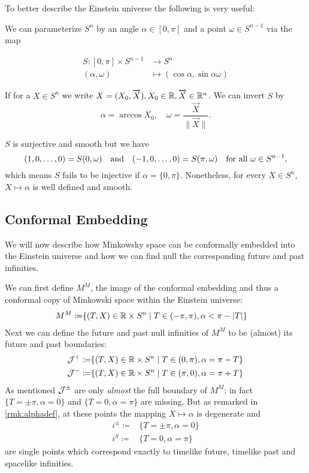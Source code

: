 To better describe the Einstein universe the following is very useful:
\begin{remark}\label{rmk:alphadef}
We can parameterize $S^n$ by an angle $\alpha\in [0,\pi]$ and a point $\omega\in S^{n-1}$ via the map 

\begin{align*}
    S:[0,\pi]\times S^{n-1}&\to S^n \\
    (\alpha,\omega) &\mapsto (\cos \alpha, \sin \alpha \omega)
\end{align*}

If for a $X\in S^n$ we write $X=(X_0,\overrightarrow{X}), X_0\in \mathbb{R}, \overrightarrow{X}\in \mathbb{R}^n$. We can invert $S$ by 
\[
    \alpha = \arccos X_0, \quad \omega=\frac{\overrightarrow{X}}{\lVert\overrightarrow{X}\rVert}.
\]

$S$ is surjective and smooth but we have 
\[(1,0,\dots, 0) = S(0,\omega) \quad \text{and} \quad (-1,0,\dots,0)=S(\pi,\omega) \quad \text{for all }\omega\in {S^{n-1}},\]
which means $S$ fails to be injective if $\alpha = \{0,\pi\}$. Nonetheless, for every $X\in S^n$, $X\mapsto \alpha$ is well defined and smooth.
\end{remark}

\subsection{Conformal Embedding}
We will now describe how Minkowsky space can be conformally embedded into the Einstein universe and how we can find null the corresponding future and past infinities.
\begin{definition}
    We can first define $M^M$, the image of the conformal embedding and thus a conformal copy of Minkowski space within the Einstein universe:
    \begin{align*}
        M^M\coloneqq &\{(T,X)\in \mathbb{R}\times S^n \mid T\in(-\pi,\pi), \alpha<\pi-\lvert T\rvert\}
    \end{align*}
    Next we can define the future and past null infinities of $M^M$ to be (almost) its future and past boundaries:
    \begin{align*}
        {\mathcal{J}}^+\coloneqq &\{(T,X)\in \mathbb{R}\times S^n \mid T\in(0,\pi), \alpha = \pi - T\}\\
        {\mathcal{J}}^-\coloneqq &\{(T,X)\in \mathbb{R}\times S^n \mid T\in(\pi,0), \alpha = \pi + T\}
    \end{align*}
    As mentioned ${\mathcal{J}}^\pm$ are only \emph{almost} the full boundary of $M^M$; in fact $\{T=\pm\pi,\alpha=0\}$ and $\{T=0,\alpha=\pi\}$ are missing. But as remarked in \ref{rmk:alphadef}, at these points the mapping $X\mapsto \alpha$ is degenerate and 
    \begin{align*}
        i^\pm \coloneqq & \{T=\pm\pi,\alpha=0\} \\
        i^S \coloneqq  & \{T=0,\alpha=\pi\}
    \end{align*}
    are single points which correspond exactly to timelike future, timelike past and spacelike infinities.
\end{definition}

